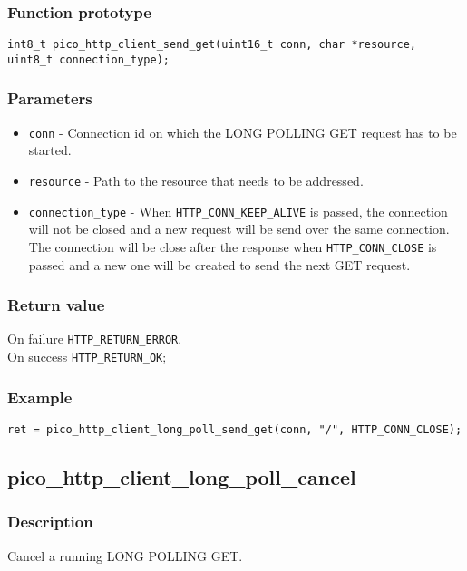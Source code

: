 \subsubsection*{Function prototype}
\texttt{int8\_t pico\_http\_client\_send\_get(uint16\_t conn, char *resource, uint8\_t connection\_type);}

\subsubsection*{Parameters}

\begin{itemize}[noitemsep]
\item \texttt{conn} - Connection id on which the LONG POLLING GET request has to be started.
\item \texttt{resource} - Path to the resource that needs to be addressed.
\item \texttt{connection\_type} - When \texttt{HTTP\_CONN\_KEEP\_ALIVE} is passed, the connection will not be closed and a new request will be send over the same connection. The connection will be close after the response when \texttt{HTTP\_CONN\_CLOSE} is passed and a new one will be created to send the next GET request.
\end{itemize}
\subsubsection*{Return value}
On failure \texttt{HTTP\_RETURN\_ERROR}.
\\On success \texttt{HTTP\_RETURN\_OK};
\subsubsection*{Example}
\begin{verbatim}
ret = pico_http_client_long_poll_send_get(conn, "/", HTTP_CONN_CLOSE);
\end{verbatim}


\subsection{pico\_http\_client\_long\_poll\_cancel}

\subsubsection*{Description}
Cancel a running LONG POLLING GET.

